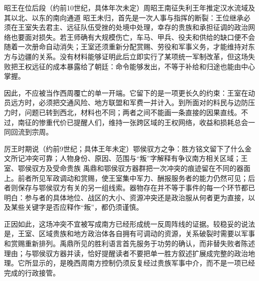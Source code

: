 \begin{event}{昭王在位后段（约前10世纪，具体年次未定）}{周昭王南征失利}{王年推定}{汉水流域及其以北、以东的南向通道}
昭王未归，首先是一次人事与指挥的断裂：王位继承必须在王室失去君主、远征队伍受挫的处境中处理，幸存的贵族和承担征调的政治网络也要面对损失。若王师确有大规模伤亡，车马、甲兵、役夫和供给的缺口便不会随着一次册命自动消失；王室还须重新分配赏赐、劳役和军事义务，才能维持对东方与边疆的关系。没有材料能够证明此后立即实行了某项统一军制改革，但这场失败把王权远征的成本暴露给了朝廷：命令能够发出，不等于补给和归途也能由中心掌握。

因此，不应被当作西周覆亡的单一开端。它留下的是一项更长久的约束：王室在动员远方时，必须把交通风险、地方联盟和军费一并计入。到所面对的料民与边防压力时，问题已转到西北，材料也不同；两者之间不能画一条直接的因果直线。不过，南征的惨重代价已提醒人们，维持一张跨区域的王权网络，收益和损耗总会一同回流到宗周。
\end{event}

\begin{event}{厉王时期说（约前9世纪；具体王年未定）}{鄂侯驭方之争：胜方铭文留下了什么}{金文所记冲突可靠；人物身份、原因、范围与“叛”字解释有争议}{南方相关区域；王室、鄂侯驭方及受命贵族}
禹鼎和鄂侯驭方器群把一次冲突的痕迹留在不同的器面上。前者所见军政调动和赏赐，使王室集中军力、酬报服务者的能力仍然可见；后者则保存与鄂侯驭方有关的另一组线索。器物存在并不等于事件的每一个环节都已明白：参与者的具体地位、战区的大小、资源冲突还是政治服从何者更为直接，以及某些关键字是否应释作“叛”，都仍须谨慎。

正因如此，这场冲突不宜被写成南方已经形成统一反周阵线的证据。较稳妥的说法是，王室、区域贵族和地方政治体各自拥有可调动的资源，关系破裂时需要以军事和赏赐重新排列。禹鼎所见的胜利语言首先服务于功劳的确认，而非替失败者陈述理由；与鄂侯驭方器并读，恰好提醒读者不要把单一胜方叙述扩展成完整的政治地理。它所显示的，是晚西周南方控制仍须反复经过贵族军事中介，而不是一项已经完成的行政接管。
\end{event}


